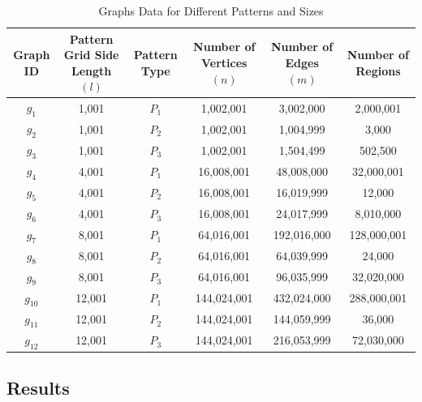\documentclass[conference]{IEEEtran}
\begin{document}
\begin{table}[t]
\centering
\begin{tabularx}{\textwidth}{|C|C|C|C|C|C|}
\hline
\textbf{Graph ID} & \boldmath\textbf{Pattern Grid Side Length \boldmath\((l)\) \unboldmath}\unboldmath & \textbf{Pattern Type} & \textbf{Number of Vertices \boldmath\((n)\) \unboldmath} & \textbf{Number of Edges \boldmath\((m)\) \unboldmath} & \textbf{Number of Regions} \\
\hline
\(g_1\) & 1,001 & \(P_1\) & 1,002,001 & 3,002,000 & 2,000,001 \\
\hline
\(g_2\) & 1,001 & \(P_2\) & 1,002,001 & 1,004,999 & 3,000 \\
\hline
\(g_3\) & 1,001 & \(P_3\) & 1,002,001 & 1,504,499 & 502,500 \\
\hline
\(g_4\) & 4,001 & \(P_1\) & 16,008,001 & 48,008,000 & 32,000,001 \\
\hline
\(g_5\) & 4,001 & \(P_2\) & 16,008,001 & 16,019,999 & 12,000 \\
\hline
\(g_6\) & 4,001 & \(P_3\) & 16,008,001 & 24,017,999 & 8,010,000 \\
\hline
\(g_7\) & 8,001 & \(P_1\) & 64,016,001 & 192,016,000 & 128,000,001 \\
\hline
\(g_8\) & 8,001 & \(P_2\) & 64,016,001 & 64,039,999 & 24,000 \\
\hline
\(g_9\) & 8,001 & \(P_3\) & 64,016,001 & 96,035,999 & 32,020,000 \\
\hline
\(g_{10}\) & 12,001 & \(P_1\) & 144,024,001 & 432,024,000 & 288,000,001 \\
\hline
\(g_{11}\) & 12,001 & \(P_2\) & 144,024,001 & 144,059,999 & 36,000 \\
\hline
\(g_{12}\) & 12,001 & \(P_3\) & 144,024,001 & 216,053,999 & 72,030,000 \\
\hline

\end{tabularx}
\caption{Graphs Data for Different Patterns and Sizes}
\label{tab:graph_data}
\end{table}

\subsection{Results}
\end{document}

